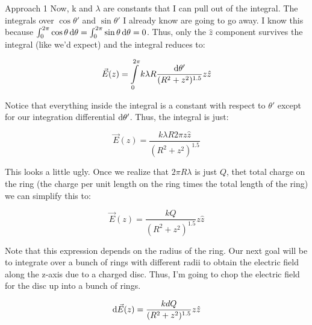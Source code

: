 \begin{homeworkProblem}
\begin{homeworkSection}{Approach 1}
        Now, k and $\lambda$ are constants that I can pull out of the
        integral. The integrals over $\cos\theta'$ and $\sin\theta'$ I
        already know are going to go away. I know this because
        $\int_0^{2\pi} \cos\theta \mathop{}\!\mathrm{d} \theta = \int_0^{2\pi}
        \sin\theta \mathop{}\!\mathrm{d} \theta = 0 $. Thus, only the $\hat{z}$
        component survives the integral (like we'd expect) and the
        integral reduces to:

        \[ \vec{E}(z) = \int\limits_0^{2\pi} k \lambda R \frac{ \mathop{}\!\mathrm{d}
        \theta'}{(R^2+z^2)^{1.5}} z \hat{z} \]

        Notice that everything inside the integral is a constant with
        respect to $\theta'$ except for our integration differential
        $\mathop{}\!\mathrm{d} \theta'$. Thus, the integral is just:

        \[ \vec{E}(z) = \frac{k\lambda R 2\pi z
        \hat{z}}{(R^2+z^2)^{1.5}} \]

        This looks a little ugly. Once we realize that $2\pi R \lambda$
        is just $Q$, thet total charge on the ring (the charge per unit
        length on the ring times the total length of the ring) we can
        simplify this to:

        \[ \vec{E}(z) = \frac{k Q }{(R^2+z^2)^{1.5}} z\hat{z} \]

        Note that this expression depends on the radius of the ring. Our
        next goal will be to integrate over a bunch of rings with
        different radii to obtain the electric field along the z-axis
        due to a charged disc. Thus, I'm going to chop the electric
        field for the disc up into a bunch of rings.
   
        \[ \mathop{}\!\mathrm{d} \vec{E}(z) = \frac{k dQ}{(R^2+z^2)^{1.5}} z\hat{z} \]


\end{homeworkSection}
\end{homeworkProblem}
